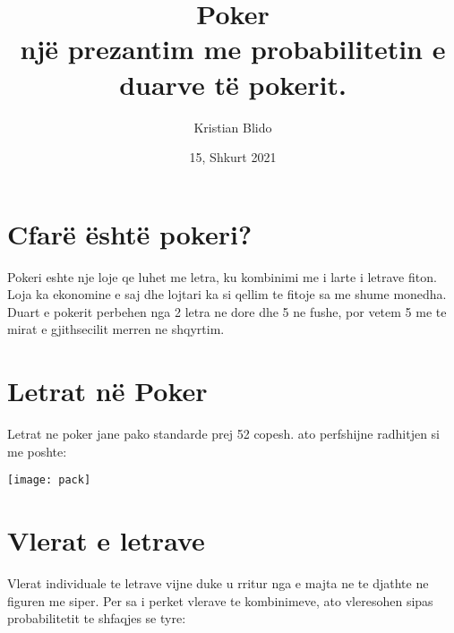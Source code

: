 \documentclass[a4paper]{article}
\title{Poker \\ një prezantim me probabilitetin e duarve të pokerit.}
\author{Kristian Blido}
\date{15, Shkurt 2021}
\begin{document}
	\maketitle
	\section* {Cfarë është pokeri?}
	Pokeri eshte nje loje qe luhet me letra, ku kombinimi me i larte i letrave fiton. Loja ka ekonomine e saj dhe lojtari ka si qellim te fitoje sa me shume monedha. Duart e pokerit perbehen nga 2 letra ne dore dhe 5 ne fushe, por vetem 5 me te mirat e gjithsecilit merren ne shqyrtim.
	\section* {Letrat në Poker}
	Letrat ne poker jane pako standarde prej 52 copesh. ato perfshijne radhitjen si me poshte:
	
	\texttt{[image: pack]}
	\section*{Vlerat e letrave}
Vlerat individuale te letrave vijne duke u rritur nga e majta ne te djathte ne figuren me siper. Per sa i perket vlerave te kombinimeve, ato vleresohen sipas probabilitetit te shfaqjes se tyre:
	
\end{document}
